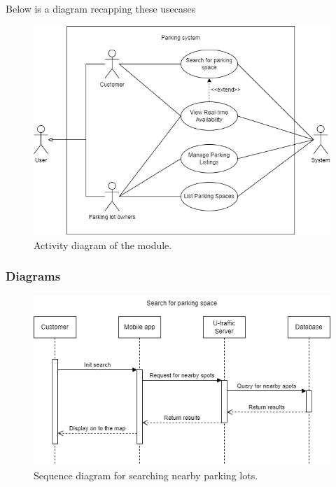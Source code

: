 \newpage
Below is a diagram recapping these usecases

\begin{figure}[H]
    \centering
    \includegraphics[width=0.7\linewidth]{assets/images/Implementation/Parking/Parking Use case updated.drawio.png}
    \caption{Activity diagram of the module.}
    \label{fig:parking_usecase}
\end{figure}

\subsubsection{Diagrams}


\begin{figure}[H]
    \centering
    \includegraphics[width=\linewidth]{assets/images/Implementation/Parking/Search_lot_sequence.png}
    \caption{Sequence diagram for searching nearby parking lots.}
    \label{fig:parking_search}
\end{figure}

